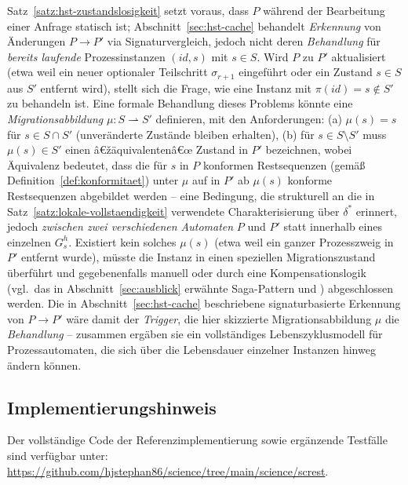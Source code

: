 ﻿\documentclass[a4paper,12pt]{article}
\theoremstyle{definition}
\begin{document}
Satz~\ref{satz:hst-zustandslosigkeit} setzt voraus, dass $P$ während der Bearbeitung
einer Anfrage statisch ist; Abschnitt~\ref{sec:hst-cache} behandelt \emph{Erkennung} von
Änderungen $P\to P'$ via Signaturvergleich, jedoch nicht deren \emph{Behandlung} für
\emph{bereits laufende} Prozessinstanzen $(id,s)$ mit $s\in S$. Wird $P$ zu $P'$
aktualisiert (etwa weil ein neuer optionaler Teilschritt $\sigma_{r+1}$ eingeführt oder
ein Zustand $s\in S$ aus $S'$ entfernt wird), stellt sich die Frage, wie eine Instanz mit
$\pi(id)=s\notin S'$ zu behandeln ist. Eine formale Behandlung dieses Problems könnte
eine \emph{Migrationsabbildung} $\mu: S\rightharpoonup S'$ definieren, mit den
Anforderungen: (a) $\mu(s)=s$ für $s\in S\cap S'$ (unveränderte Zustände bleiben
erhalten), (b) für $s\in S\setminus S'$ muss $\mu(s)\in S'$ einen â€žäquivalentenâ€œ Zustand
in $P'$ bezeichnen, wobei Äquivalenz bedeutet, dass die für $s$ in $P$ konformen
Restsequenzen (gemäß Definition~\ref{def:konformitaet}) unter $\mu$ auf in $P'$ ab
$\mu(s)$ konforme Restsequenzen abgebildet werden -- eine Bedingung, die strukturell an
die in Satz~\ref{satz:lokale-vollstaendigkeit} verwendete Charakterisierung über
$\delta^{*}$ erinnert, jedoch \emph{zwischen zwei verschiedenen Automaten} $P$ und $P'$
statt innerhalb eines einzelnen $G_s^h$. Existiert kein solches $\mu(s)$ (etwa weil ein
ganzer Prozesszweig in $P'$ entfernt wurde), müsste die Instanz in einen speziellen
Migrationszustand überführt und gegebenenfalls manuell oder durch eine
Kompensationslogik (vgl.\ das in Abschnitt~\ref{sec:ausblick} erwähnte Saga-Pattern und
\cite{garcia1987}) abgeschlossen werden. Die in Abschnitt~\ref{sec:hst-cache}
beschriebene signaturbasierte Erkennung von $P\to P'$ wäre damit der \emph{Trigger}, die
hier skizzierte Migrationsabbildung $\mu$ die \emph{Behandlung} -- zusammen ergäben sie
ein vollständiges Lebenszyklusmodell für Prozessautomaten, die sich über die Lebensdauer
einzelner Instanzen hinweg ändern können.

\subsection{Implementierungshinweis}

Der vollständige Code der Referenzimplementierung sowie ergänzende Testfälle sind
verfügbar unter: \url{https://github.com/hjstephan86/science/tree/main/science/screst}.
\end{document}
